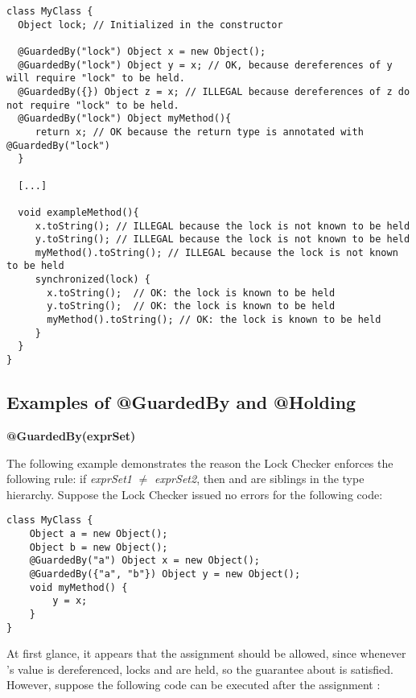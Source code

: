 \begin{Verbatim}
class MyClass {
  Object lock; // Initialized in the constructor

  @GuardedBy("lock") Object x = new Object();
  @GuardedBy("lock") Object y = x; // OK, because dereferences of y will require "lock" to be held.
  @GuardedBy({}) Object z = x; // ILLEGAL because dereferences of z do not require "lock" to be held.
  @GuardedBy("lock") Object myMethod(){
     return x; // OK because the return type is annotated with @GuardedBy("lock")
  }

  [...]

  void exampleMethod(){
     x.toString(); // ILLEGAL because the lock is not known to be held
     y.toString(); // ILLEGAL because the lock is not known to be held
     myMethod().toString(); // ILLEGAL because the lock is not known to be held
     synchronized(lock) {
       x.toString();  // OK: the lock is known to be held
       y.toString();  // OK: the lock is known to be held
       myMethod().toString(); // OK: the lock is known to be held
     }
  }
}
\end{Verbatim}


\subsection{Examples of @GuardedBy and @Holding\label{lock-examples-guardedby-and-holding}}

\textbf{@GuardedBy(exprSet)}

The following example demonstrates the reason the Lock Checker enforces the
following rule:  if \emph{exprSet1} $\neq$ \emph{exprSet2}, then
 and  are siblings in the type
hierarchy.  Suppose the Lock Checker issued no errors for the following code:

\begin{Verbatim}
class MyClass {
    Object a = new Object();
    Object b = new Object();
    @GuardedBy("a") Object x = new Object();
    @GuardedBy({"a", "b"}) Object y = new Object();
    void myMethod() {
        y = x;
    }
}
\end{Verbatim}

At first glance, it appears that the assignment should be allowed, since
whenever 's value is dereferenced, locks  and  are
held, so the guarantee about  is satisfied.  However, suppose the
following code can be executed after the assignment :

